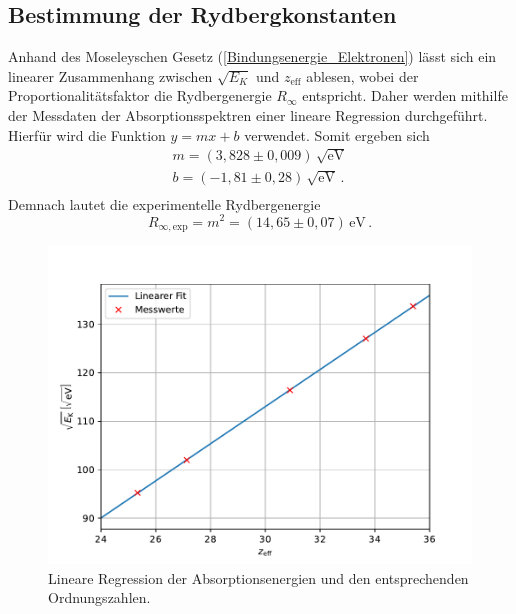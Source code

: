 \subsection{Bestimmung der Rydbergkonstanten}
Anhand des Moseleyschen Gesetz (\ref{Bindungsenergie_Elektronen}) lässt sich ein linearer Zusammenhang zwischen
$\sqrt{E_K}$ und $z_{\text{eff}}$ ablesen, wobei der Proportionalitätsfaktor die Rydbergenergie
$R_{\infty}$ entspricht. Daher werden mithilfe der Messdaten der Absorptionsspektren einer 
lineare Regression durchgeführt. Hierfür wird die Funktion
$y =mx+b$ verwendet. Somit ergeben sich 
\begin{align*}
  m=(3,828\pm0,009)\,\sqrt{\unit{\eV}}\\
  b=(-1,81\pm0,28)\,\sqrt{\unit{\eV}}\,.\\
\end{align*}
Demnach lautet die experimentelle Rydbergenergie 
$$R_{\infty,\text{exp}} = m^2=(14,65\pm0,07)\,\unit{\eV}\,.$$
\begin{figure}[H]
  \centering
  \includegraphics[width=\textwidth]{content/Plots/Rydberg.pdf}
  \caption{Lineare Regression der Absorptionsenergien und den entsprechenden Ordnungszahlen.}
  \label{fig:Rydberg}
\end{figure}
